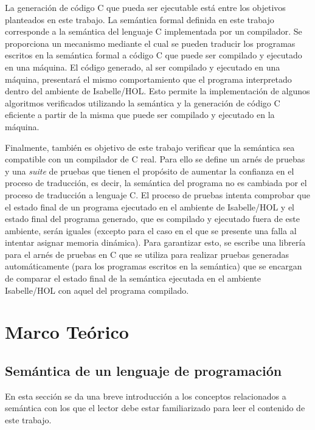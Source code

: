La generación de código C que pueda ser ejecutable está entre los objetivos planteados en este trabajo.
La semántica formal definida en este trabajo corresponde a la semántica del lenguaje C implementada por un compilador.
Se proporciona un mecanismo mediante el cual se pueden traducir los programas escritos en la semántica formal a código C que puede ser compilado y ejecutado en una máquina.
El código generado, al ser compilado y ejecutado en una máquina, presentará el mismo comportamiento que el programa interpretado dentro del ambiente de Isabelle/HOL.
Esto permite la implementación de algunos algoritmos verificados utilizando la semántica y la generación de código C eficiente a partir de la misma que puede ser compilado y ejecutado en la máquina.

Finalmente, también es objetivo de este trabajo verificar que la semántica sea compatible con un compilador de C real.
Para ello se define un arnés de pruebas y una \textit{suite} de pruebas que tienen el propósito de aumentar la confianza en el proceso de traducción, es decir, la semántica del programa no es cambiada por el proceso de traducción a lenguaje C.
El proceso de pruebas intenta comprobar que el estado final de un programa ejecutado en el ambiente de Isabelle/HOL y el estado final del programa generado, que es compilado y ejecutado fuera de este ambiente, serán iguales (excepto para el caso en el que se presente una falla al intentar asignar memoria dinámica).
Para garantizar esto, se escribe una librería para el arnés de pruebas en C que se utiliza para realizar pruebas generadas automáticamente (para los programas escritos en la semántica) que se encargan de comparar el estado final de la semántica ejecutada en el ambiente Isabelle/HOL con aquel del programa compilado.


\section{Marco Teórico}
\begin{comment}
FIXME! no se si está bien este título.
\end{comment}

\subsection{Semántica de un lenguaje de programación}

En esta sección se da una breve introducción a los conceptos relacionados a semántica con los que el lector debe estar familiarizado para leer el contenido de este trabajo.

